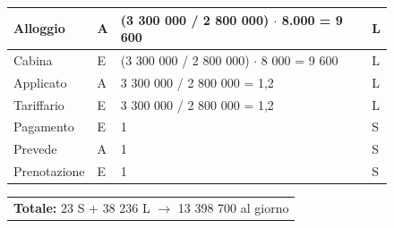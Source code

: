\documentclass[a4paper, titlepage]{report}
\begin{document}
\begin{figure}[h]
\begin{tabular}{L{3cm}C{2.5cm}C{4cm}C{2.5cm}}
			\hline\rule[-2mm]{0mm}{0.65cm}{}
			Alloggio & A & (3 300 000 / 2 800 000) $\cdot$ 8.000 = 9 600 & L \\
			\hline\rule[-2mm]{0mm}{0.65cm}{}
			Cabina & E & (3 300 000 / 2 800 000) $\cdot$ 8 000 = 9 600 & L \\
			\hline\rule[-2mm]{0mm}{0.65cm}{}
            Applicato & A & 3 300 000 / 2 800 000 = 1,2 & L \\
            \hline\rule[-2mm]{0mm}{0.65cm}{}
            Tariffario & E & 3 300 000 / 2 800 000 = 1,2 & L \\
            \hline\rule[-2mm]{0mm}{0.65cm}{}
			Pagamento & E & 1 & S \\
			\hline\rule[-2mm]{0mm}{0.65cm}{}
			Prevede & A & 1 & S \\
            \hline\rule[-2mm]{0mm}{0.65cm}{}
			Prenotazione & E & 1 & S \\
		\end{tabular}
		\begin{tabular}{C{13.9cm}}
			\rule[-4mm]{0mm}{1cm}{}	
			 \textbf{Totale:} 23 S + 38 236 L $\to$ 13 398 700 al giorno
		\end{tabular}
	\end{figure}
\newpage
\end{document}
